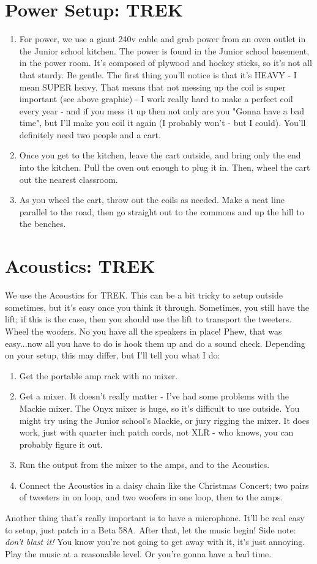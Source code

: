 \documentclass[11pt,a4paper]{book}
\begin{document}
\section{Power Setup: TREK}
\begin{enumerate}
\item For power, we use a giant 240v cable and grab power from an oven outlet in the Junior school kitchen. The power is found in the Junior school basement, in the power room. It's composed of plywood and hockey sticks, so it's not all that sturdy. Be gentle. The first thing you'll notice is that it's HEAVY - I mean SUPER heavy. That means that not messing up the coil is super important (see above graphic) - I work really hard to make a perfect coil every year - and if you mess it up then not only are you "Gonna have a bad time", but I'll make you coil it again (I probably won't - but I could). You'll definitely need two people and a cart. 
\item Once you get to the kitchen, leave the cart outside, and bring only the end into the kitchen. Pull the oven out enough to plug it in. Then, wheel the cart out the nearest classroom.
\item As you wheel the cart, throw out the coils as needed. Make a neat line parallel to the road, then go straight out to the commons and up the hill to the benches.
\end{enumerate}
\section{Acoustics: TREK}
We use the Acoustics for TREK. This can be a bit tricky to setup outside sometimes, but it's easy once you think it through. Sometimes, you still have the lift; if this is the case, then you should use the lift to transport the tweeters. Wheel the woofers. No you have all the speakers in place! Phew, that was easy...now all you have to do is hook them up and do a sound check. Depending on your setup, this may differ, but I'll tell you what I do:
\begin{enumerate}
\item Get the portable amp rack with no mixer.
\item Get a mixer. It doesn't really matter - I've had some problems with the Mackie mixer. The Onyx mixer is huge, so it's difficult to use outside. You might try using the Junior school's Mackie, or jury rigging the mixer. It does work, just with quarter inch patch cords, not XLR - who knows, you can probably figure it out.
\item Run the output from the mixer to the amps, and to the Acoustics. 
\item Connect the Acoustics in a daisy chain like the Christmas Concert; two pairs of tweeters in on loop, and two woofers in one loop, then to the amps.
\end{enumerate} 
Another thing that's really important is to have a microphone. It'll be real easy to setup, just patch in a Beta 58A. After that, let the music begin! Side note: \textit{don't blast it!} You know you're not going to get away with it, it's just annoying. Play the music at a reasonable level. Or you're gonna have a bad time. 
\end{document}
